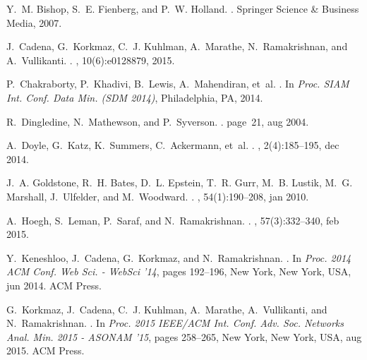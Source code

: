 \documentclass[11pt,a4paper,extrafontsizes,oneside]{article}
\begin{document}
\begin{thebibliography}{10}

Y.~M. Bishop, S.~E. Fienberg, and P.~W. Holland.
.
\newblock Springer Science \& Business Media, 2007.

J.~Cadena, G.~Korkmaz, C.~J. Kuhlman, A.~Marathe, N.~Ramakrishnan, and
  A.~Vullikanti.
.
, 10(6):e0128879, 2015.

P.~Chakraborty, P.~Khadivi, B.~Lewis, A.~Mahendiran, et~al.
.
\newblock In {\em Proc. SIAM Int. Conf. Data Min. (SDM 2014)}, Philadelphia,
  PA, 2014.

R.~Dingledine, N.~Mathewson, and P.~Syverson.
.
\newblock page~21, aug 2004.

A.~Doyle, G.~Katz, K.~Summers, C.~Ackermann, et~al.
.
, 2(4):185--195, dec 2014.

J.~A. Goldstone, R.~H. Bates, D.~L. Epstein, T.~R. Gurr, M.~B. Lustik, M.~G.
  Marshall, J.~Ulfelder, and M.~Woodward.
.
, 54(1):190--208, jan 2010.

A.~Hoegh, S.~Leman, P.~Saraf, and N.~Ramakrishnan.
.
, 57(3):332--340, feb 2015.

Y.~Keneshloo, J.~Cadena, G.~Korkmaz, and N.~Ramakrishnan.
.
\newblock In {\em Proc. 2014 ACM Conf. Web Sci. - WebSci '14}, pages 192--196,
  New York, New York, USA, jun 2014. ACM Press.

G.~Korkmaz, J.~Cadena, C.~J. Kuhlman, A.~Marathe, A.~Vullikanti, and
  N.~Ramakrishnan.
.
\newblock In {\em Proc. 2015 IEEE/ACM Int. Conf. Adv. Soc. Networks Anal. Min.
  2015 - ASONAM '15}, pages 258--265, New York, New York, USA, aug 2015. ACM
  Press.


\end{thebibliography}
\end{document}
